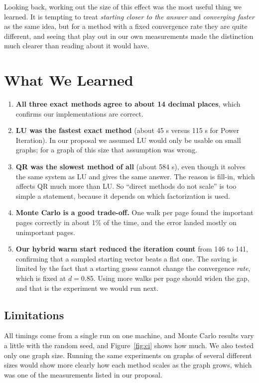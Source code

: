 \documentclass[11pt,a4paper]{article}
\begin{document}
Looking back, working out the size of this effect was the most useful thing we
learned. It is tempting to treat \emph{starting closer to the answer} and
\emph{converging faster} as the same idea, but for a method with a fixed convergence
rate they are quite different, and seeing that play out in our own measurements made
the distinction much clearer than reading about it would have.

\section{What We Learned}

\begin{enumerate}
  \item \textbf{All three exact methods agree to about 14 decimal places}, which
        confirms our implementations are correct.
  \item \textbf{LU was the fastest exact method} (about 45 s versus 115 s for Power
        Iteration). In our proposal we assumed LU would only be usable on small
        graphs; for a graph of this size that assumption was wrong.
  \item \textbf{QR was the slowest method of all} (about 584 s), even though it solves
        the same system as LU and gives the same answer. The reason is fill-in, which
        affects QR much more than LU. So ``direct methods do not scale'' is too simple
        a statement, because it depends on which factorization is used.
  \item \textbf{Monte Carlo is a good trade-off.} One walk per page found the
        important pages correctly in about 1\% of the time, and the error landed
        mostly on unimportant pages.
  \item \textbf{Our hybrid warm start reduced the iteration count} from 146 to 141,
        confirming that a sampled starting vector beats a flat one. The saving is
        limited by the fact that a starting guess cannot change the convergence
        \emph{rate}, which is fixed at $d = 0.85$. Using more walks per page should
        widen the gap, and that is the experiment we would run next.
\end{enumerate}

\subsection*{Limitations}

All timings come from a single run on one machine, and Monte Carlo results vary a
little with the random seed, and Figure~\ref{fig:ci} shows how much. We also tested only
one graph size. Running the same experiments on graphs of several different sizes would
show more clearly how each method scales as the graph grows, which was one of the
measurements listed in our proposal.
\end{document}
